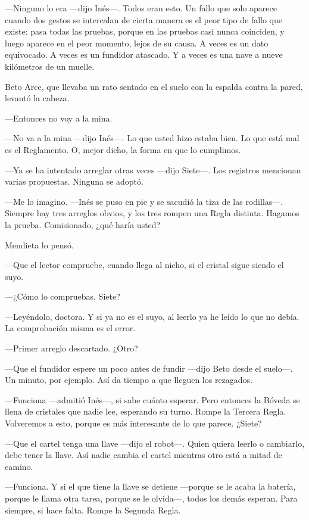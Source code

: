 ---Ninguno lo era ---dijo Inés---\nobreak. Todos eran esto. Un fallo que solo aparece cuando dos gestos se intercalan de cierta manera es el peor tipo de fallo que existe: pasa todas las pruebas, porque en las pruebas casi nunca coinciden, y luego aparece en el peor momento, lejos de su causa. A veces es un dato equivocado. A veces es un fundidor atascado. Y a veces es una nave a nueve kilómetros de un muelle.

\escena
Beto Arce, que llevaba un rato sentado en el suelo con la espalda contra la pared, levantó la cabeza.

---Entonces no voy a la mina.

---No va a la mina ---dijo Inés---\nobreak. Lo que usted hizo estaba bien. Lo que está mal es el Reglamento. O, mejor dicho, la forma en que lo cumplimos.

---Ya se ha intentado arreglar otras veces ---dijo Siete---\nobreak. Los registros mencionan varias propuestas. Ninguna se adoptó.

---Me lo imagino. ---Inés se puso en pie y se sacudió la tiza de las rodillas---\nobreak. Siempre hay tres arreglos obvios, y los tres rompen una Regla distinta. Hagamos la prueba. Comisionado, ¿qué haría usted?

Mendieta lo pensó.

---Que el lector compruebe, cuando llega al nicho, si el cristal sigue siendo el suyo.

---¿Cómo lo compruebas, Siete?

---Leyéndolo, doctora. Y si ya no es el suyo, al leerlo ya he leído lo que no debía. La comprobación misma es el error.

---Primer arreglo descartado. ¿Otro?

---Que el fundidor espere un poco antes de fundir ---dijo Beto desde el suelo---\nobreak. Un minuto, por ejemplo. Así da tiempo a que lleguen los rezagados.

---Funciona ---admitió Inés---\nobreak, si sabe cuánto esperar. Pero entonces la Bóveda se llena de cristales que nadie lee, esperando su turno. Rompe la Tercera Regla. Volveremos a esto, porque es más interesante de lo que parece. ¿Siete?

---Que el cartel tenga una llave ---dijo el robot---\nobreak. Quien quiera leerlo o cambiarlo, debe tener la llave. Así nadie cambia el cartel mientras otro está a mitad de camino.

---Funciona. Y si el que tiene la llave se detiene ---porque se le acaba la batería, porque le llama otra tarea, porque se le olvida---\nobreak, todos los demás esperan. Para siempre, si hace falta. Rompe la Segunda Regla.

